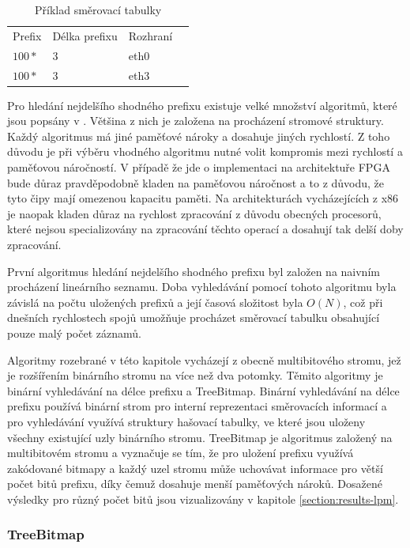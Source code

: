 \begin{table}[!htbp]
	\center
    \begin{tabular}{|l|l|l|l|}
    \hline
    Prefix & Délka prefixu & Rozhraní \\ \hhline{|=|=|=|=|}
    $100*$ & 3 & eth0 \\ \hline
    $100*$ & 3 & eth3 \\ \hline
    \end{tabular}
    \caption{Příklad směrovací tabulky}
\end{table}

Pro hledání nejdelšího shodného prefixu existuje velké množství algoritmů, které jsou popsány v \cite{tbm}.
Většina z nich je založena na procházení stromové struktury. Každý algoritmus má jiné paměťové nároky
a dosahuje jiných rychlostí. Z toho důvodu je při výběru vhodného algoritmu nutné
volit kompromis mezi rychlostí a paměťovou náročností.
V případě že jde o implementaci na architektuře FPGA bude důraz pravděpodobně kladen na paměťovou náročnost
a to z důvodu, že tyto čipy mají omezenou kapacitu paměti. Na architekturách vycházejících z x86 je naopak kladen důraz
na rychlost zpracování z důvodu obecných procesorů, které nejsou specializovány na zpracování těchto operací
a dosahují tak delší doby zpracování.

První algoritmus hledání nejdelšího shodného prefixu byl založen na naivním procházení lineárního
seznamu. Doba vyhledávání pomocí tohoto algoritmu byla závislá na počtu uložených prefixů a její
časová složitost byla $O(N)$, což při dnešních rychlostech spojů umožňuje procházet směrovací tabulku
obsahující pouze malý počet záznamů.

Algoritmy rozebrané v této kapitole vycházejí z obecně multibitového stromu,
jež je rozšířením binárního stromu na více než dva potomky.
Těmito algoritmy je binární vyhledávání na délce prefixu a TreeBitmap.
Binární vyhledávání na délce prefixu používá binární strom pro interní reprezentaci směrovacích
informací a pro vyhledávání využívá struktury hašovací tabulky, ve které jsou uloženy všechny existující uzly
binárního stromu.
TreeBitmap je algoritmus založený na multibitovém stromu a vyznačuje se tím,
že pro uložení prefixu využívá zakódované bitmapy a každý uzel stromu může uchovávat informace pro větší počet bitů prefixu, díky čemuž dosahuje menší paměťových nároků.
Dosažené výsledky pro různý počet bitů jsou vizualizovány v kapitole \ref{section:results-lpm}.


\subsubsection{TreeBitmap} %

